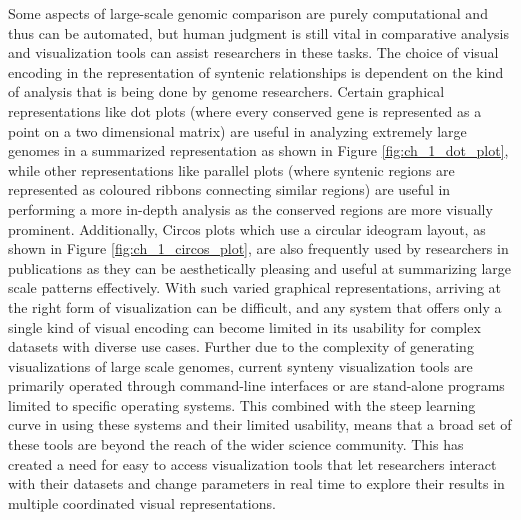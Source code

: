 Some aspects of large-scale genomic comparison are purely computational and thus can be automated, but human judgment is still vital in comparative analysis and visualization tools can assist researchers in these tasks. The choice of visual encoding in the representation of syntenic relationships is dependent on the kind of analysis that is being done by genome researchers. Certain graphical representations like dot plots (where every conserved gene is represented as a point on a two dimensional matrix) are useful in analyzing extremely large genomes in a summarized representation as shown in Figure \ref{fig:ch_1_dot_plot}, while other representations like parallel plots (where syntenic regions are represented as coloured ribbons connecting similar regions) are useful in performing a more in-depth analysis as the conserved regions are more visually prominent. Additionally, Circos plots which use a circular ideogram layout, as shown in Figure \ref{fig:ch_1_circos_plot}, are also frequently used by researchers in publications as they can be aesthetically pleasing and useful at summarizing large scale patterns effectively. With such varied graphical representations, arriving at the right form of visualization can be difficult, and any system that offers only a single kind of visual encoding can become limited in its usability for complex datasets with diverse use cases. Further due to the complexity of generating visualizations of large scale genomes, current synteny visualization tools are primarily operated through command-line interfaces or are stand-alone programs limited to specific operating systems. This combined with the steep learning curve in using these systems and their limited usability, means that a broad set of these tools are beyond the reach of the wider science community. This has created a need for easy to access visualization tools that let researchers interact with their datasets and change parameters in real time to explore their results in multiple coordinated visual representations.

